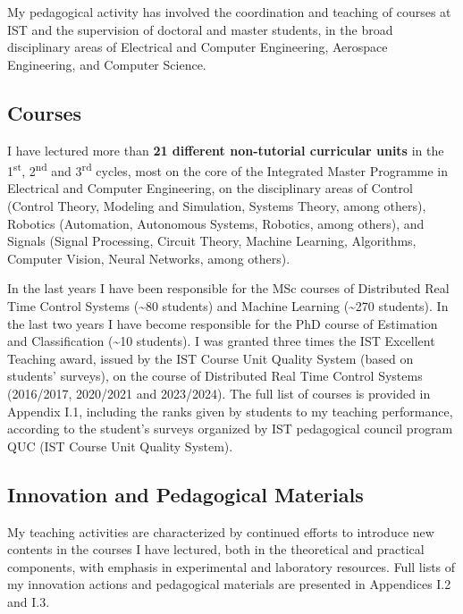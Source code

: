 \documentclass[
]{article}
\begin{document}
My pedagogical activity has involved the coordination and teaching of
courses at IST and the supervision of doctoral and master students, in
the broad disciplinary areas of Electrical and Computer Engineering,
Aerospace Engineering, and Computer Science.

\subsection{Courses}\label{courses}

I have lectured more than \textbf{21 different non-tutorial curricular
units} in the 1\textsuperscript{st}, 2\textsuperscript{nd} and
3\textsuperscript{rd} cycles, most on the core of the Integrated Master
Programme in Electrical and Computer Engineering, on the disciplinary
areas of Control (Control Theory, Modeling and Simulation, Systems
Theory, among others), Robotics (Automation, Autonomous Systems,
Robotics, among others), and Signals (Signal Processing, Circuit Theory,
Machine Learning, Algorithms, Computer Vision, Neural Networks, among
others).

In the last years I have been responsible for the MSc courses of
Distributed Real Time Control Systems (\textasciitilde80 students) and
Machine Learning (\textasciitilde270 students). In the last two years I
have become responsible for the PhD course of Estimation and
Classification (\textasciitilde10 students). I was granted three times
the IST Excellent Teaching award, issued by the IST Course Unit Quality
System (based on students' surveys), on the course of Distributed Real
Time Control Systems (2016/2017, 2020/2021 and 2023/2024). The full list
of courses is provided in Appendix I.1, including the ranks given by
students to my teaching performance, according to the student's surveys
organized by IST pedagogical council program QUC (IST Course Unit
Quality System).

\subsection{Innovation and Pedagogical
Materials}\label{innovation-and-pedagogical-materials}

My teaching activities are characterized by continued efforts to
introduce new contents in the courses I have lectured, both in the
theoretical and practical components, with emphasis in experimental and
laboratory resources. Full lists of my innovation actions and
pedagogical materials are presented in Appendices I.2 and I.3.
\end{document}
